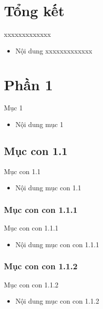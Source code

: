 \documentclass{beamer}
\begin{document}
\section{Tổng kết}
\begin{frame}{xxxxxxxxxxxxx}
\begin{itemize}
\item Nội dung xxxxxxxxxxxxx
\end{itemize}
\end{frame}

\section{Phần 1}
\begin{frame}{Mục 1}
\begin{itemize}
\item Nội dung mục 1
\end{itemize}
\end{frame}

\subsection{Mục con 1.1}
\begin{frame}{Mục con 1.1}
\begin{itemize}
\item Nội dung mục con 1.1
\end{itemize}
\end{frame}

\subsubsection{Mục con con 1.1.1}
\begin{frame}{Mục con con 1.1.1}
\begin{itemize}
\item Nội dung mục con con 1.1.1
\end{itemize}
\end{frame}

\subsubsection{Mục con con 1.1.2}
\begin{frame}{Mục con con 1.1.2}
\begin{itemize}
\item Nội dung mục con con 1.1.2
\end{itemize}
\end{frame}
\end{document}
